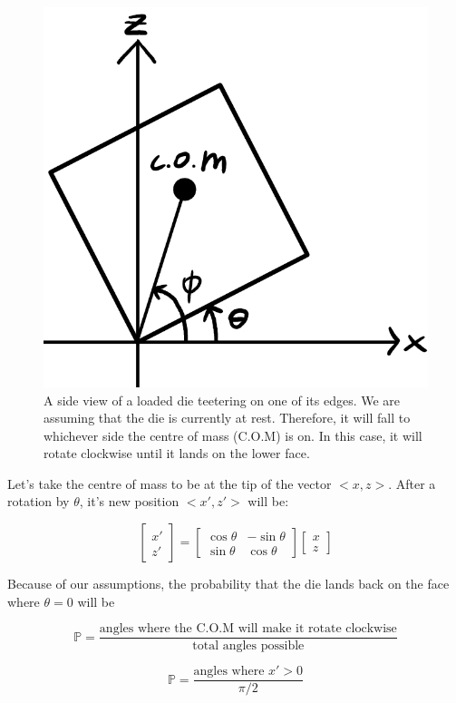 \documentclass[english,12pt,a4paper,final]{article}
\begin{document}
\begin{figure}[H]
	\centering
	\includegraphics[width=0.5\linewidth]{loadedDie}
	\caption[A loaded die teetering on one of its edges]{A side view of a loaded die teetering on one of its edges. We are assuming that the die is currently at rest. Therefore, it will fall to whichever side the centre of mass (C.O.M) is on. In this case, it will rotate clockwise until it lands on the lower face.}
	\label{fig:loadeddie}
\end{figure}

Let's take the centre of mass to be at the tip of the vector $<x, z>$. After a rotation by $\theta$, it's new position $<x', z'>$ will be:

\begin{equation*}
	\begin{bmatrix} x' \\ z' \end{bmatrix} = \begin{bmatrix} \cos\theta & -\sin\theta \\ \sin\theta & \cos\theta \end{bmatrix} \begin{bmatrix} x \\ z \end{bmatrix}
\end{equation*}


Because of our assumptions, the probability that the die lands back on the face where $\theta=0$ will be 

\begin{equation*}
	\mathbb{P} = \frac{\text{angles where the C.O.M will make it rotate clockwise}}{\text{total angles possible}}
\end{equation*}

\begin{equation*}
	 \mathbb{P} = \frac{\text{angles where $x' > 0$}}{\pi/2}
\end{equation*}
\end{document}
